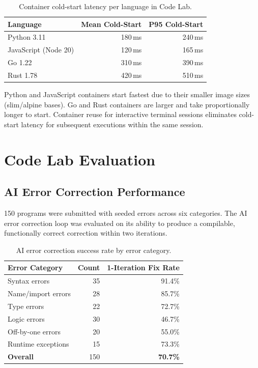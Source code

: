 \begin{table}[ht]
    \centering
    \caption{Container cold-start latency per language in Code Lab.}
    \label{tab:coldstart}
    \renewcommand{\arraystretch}{1.3}
    \begin{tabular}{lrr}
        \toprule
        \textbf{Language} & \textbf{Mean Cold-Start} & \textbf{P95 Cold-Start} \\
        \midrule
        Python 3.11 & 180\,ms & 240\,ms \\
        JavaScript (Node 20) & 120\,ms & 165\,ms \\
        Go 1.22     & 310\,ms & 390\,ms \\
        Rust 1.78   & 420\,ms & 510\,ms \\
        \bottomrule
    \end{tabular}
\end{table}

Python and JavaScript containers start fastest due to their smaller image sizes (slim/alpine bases). Go and Rust containers are larger and take proportionally longer to start. Container reuse for interactive terminal sessions eliminates cold-start latency for subsequent executions within the same session.

\section{Code Lab Evaluation}
\label{sec:codelab-results}

\subsection{AI Error Correction Performance}
\label{subsec:error-correction-results}

150 programs were submitted with seeded errors across six categories. The AI error correction loop was evaluated on its ability to produce a compilable, functionally correct correction within two iterations.

\begin{table}[ht]
    \centering
    \caption{AI error correction success rate by error category.}
    \label{tab:error-correction}
    \renewcommand{\arraystretch}{1.3}
    \begin{tabular}{lrr}
        \toprule
        \textbf{Error Category} & \textbf{Count} & \textbf{1-Iteration Fix Rate} \\
        \midrule
        Syntax errors           & 35 & 91.4\% \\
        Name/import errors      & 28 & 85.7\% \\
        Type errors             & 22 & 72.7\% \\
        Logic errors            & 30 & 46.7\% \\
        Off-by-one errors       & 20 & 55.0\% \\
        Runtime exceptions      & 15 & 73.3\% \\
        \midrule
        \textbf{Overall}        & 150 & \textbf{70.7\%} \\
        \bottomrule
    \end{tabular}
\end{table}

